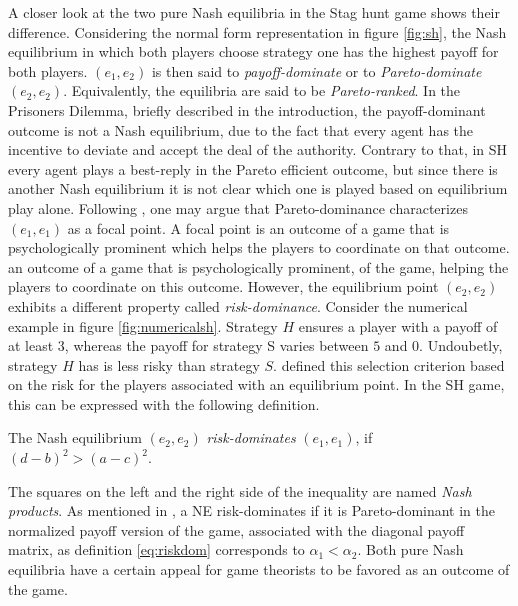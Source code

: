 A closer look at the two pure Nash equilibria in the Stag hunt game 
shows their difference. Considering the normal form representation in figure 
\ref{fig:sh}, the Nash equilibrium in which both players choose strategy one 
has the highest payoff
for both players. $(e_1,e_2)$ is then said to 
\textit{payoff-dominate} or to \textit{Pareto-dominate} 
$(e_2,e_2)$. Equivalently, the equilibria are said to be
\textit{Pareto-ranked}.
In the Prisoners Dilemma, briefly described in the introduction, 
the payoff-dominant outcome is not a 
Nash equilibrium, due to the fact that every agent has the incentive to 
deviate and accept the deal of the authority.
Contrary to that, in SH every agent plays a best-reply 
in the Pareto efficient outcome, but since there is another Nash equilibrium 
it is not clear which one is played based on equilibrium play alone. 
Following \textcite[57]{schelling_strategy_1960}, one may argue that 
Pareto-dominance characterizes $(e_1,e_1)$ as a focal point. 
A focal point is an outcome of a game that is psychologically prominent which
helps the players to coordinate on that outcome.
an outcome of a game that is psychologically prominent, of 
the game, helping the players to coordinate on this outcome.
However, the equilibrium point $(e_2,e_2)$ exhibits a different property
called \textit{risk-dominance}. 
Consider the numerical example in figure \ref{fig:numericalsh}. 
Strategy $H$ ensures a player with a payoff of at least $3$, whereas the 
payoff for strategy S varies between $5$ and $0$. Undoubetly, 
strategy $H$ has is less risky than strategy $S$.  
\textcite{harsanyi_general_1988} defined this selection criterion 
based on the risk for the players associated with an 
equilibrium point. In the SH game, this can be expressed with the following
definition.
\begin{mydef}
The Nash equilibrium $(e_2,e_2)$ \textit{risk-dominates} 
$(e_1,e_1)$, if $(d-b)^2 > (a-c)^2$.
         \label{eq:riskdom}
 \end{mydef}
The squares on the left and the right side of the inequality are named
\textit{Nash products}.
As mentioned in \textcite{weibull_evolutionary_1997}, a NE risk-dominates 
if it is Pareto-dominant in the normalized payoff version of the game, 
associated with the diagonal payoff matrix, 
as definition \eqref{eq:riskdom} corresponds to $\alpha_1 < \alpha_2$.
Both pure Nash equilibria have a certain appeal for game theorists to be
favored as an outcome of the game. 

